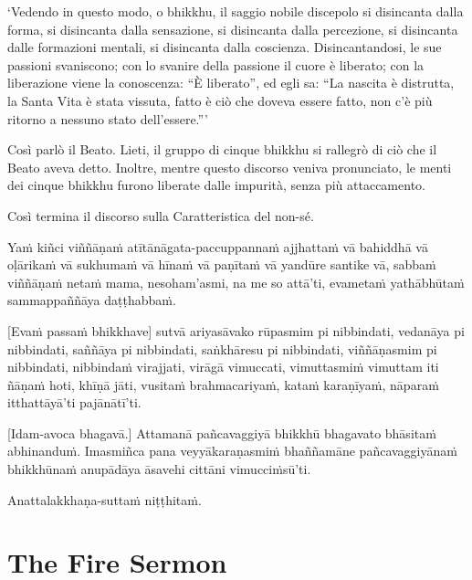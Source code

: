 ‘Vedendo in questo modo, o bhikkhu, il saggio nobile discepolo si
disincanta dalla forma, si disincanta dalla sensazione, si
disincanta dalla percezione, si disincanta dalle formazioni
mentali, si disincanta dalla coscienza. Disincantandosi,
le sue passioni svaniscono; con lo svanire della passione il
cuore è liberato; con la liberazione viene la conoscenza: “È
liberato”, ed egli sa: “La nascita è distrutta, la Santa Vita è stata
vissuta, fatto è ciò che doveva essere fatto, non c'è più ritorno a nessuno
stato dell'essere.”\thinspace ’

Così parlò il Beato. Lieti, il gruppo di cinque bhikkhu
si rallegrò di ciò che il Beato aveva detto. Inoltre, mentre questo discorso veniva
pronunciato, le menti dei cinque bhikkhu furono liberate dalle
impurità, senza più attaccamento.

Così termina il discorso sulla Caratteristica del non-sé.


\clearpage

\paliText
\markboth{\paliTitle}{\rightmark}

Yaṁ kiñci viññāṇaṁ atītānāgata-paccuppannaṁ ajjhattaṁ vā bahiddhā vā
oḷārikaṁ vā sukhumaṁ vā hīnaṁ vā paṇītaṁ vā yandūre santike vā, sabbaṁ
viññāṇaṁ netaṁ mama, nesoham'asmi, na me so attā'ti, evametaṁ yathābhūtaṁ
sammappaññāya daṭṭhabbaṁ.

[Evaṁ passaṁ bhikkhave] sutvā ariyasāvako rūpasmim pi nibbindati, vedanāya
pi nibbindati, saññāya pi nibbindati, saṅkhāresu pi nibbindati,
viññāṇasmim pi nibbindati, nibbindaṁ virajjati, virāgā vimuccati,
vimuttasmiṁ vimuttam iti ñāṇaṁ hoti, khīṇā jāti, vusitaṁ brahmacariyaṁ,
kataṁ karaṇīyaṁ, nāparaṁ itthattāyā'ti pajānātī'ti.

[Idam-avoca bhagavā.] Attamanā pañcavaggiyā bhikkhū bhagavato bhāsitaṁ
abhinanduṁ. Imasmiñca pana veyyākaraṇasmiṁ bhaññamāne pañcavaggiyānaṁ
bhikkhūnaṁ anupādāya āsavehi cittāni vimucciṁsū'ti.

Anattalakkhaṇa-suttaṁ niṭṭhitaṁ.

\chapterTocDelegatePageNumber
\chapter{The Fire Sermon}

\setTocDelegatedPageNumber
\englishText
\renewcommand{\englishTitle}{The Fire Sermon}

